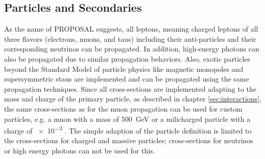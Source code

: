 %

\subsection{Particles and Secondaries} \label{sec:particle}

As the name of PROPOSAL suggests, all leptons, meaning charged leptons of all three flavors (electrons, muons, and taus) including their anti-particles and their corresponding neutrinos can be propagated.
In addition, high-energy photons can also be propagated due to similar propagation behaviors.
Also, exotic particles beyond the Standard Model of particle physics like magnetic monopoles and supersymmetric staus are implemented and can be propagated using the same propagation techniques.
Since all cross-sections are implemented adapting to the mass and charge of the primary particle, as described in chapter \ref{sec:interactions}, the same cross-sections as for the muon propagation can be used for custom particles, e.g. a muon with a mass of \SI{500}{GeV} or a milicharged particle with a charge of \num{e-3} \cite{Plestid20MiliCharged, Arguelles21MiliCharged}.
The simple adaption of the particle definition is limited to the cross-sections for charged and massive particles; cross-sections for neutrinos or high energy photons can not be used for this.

